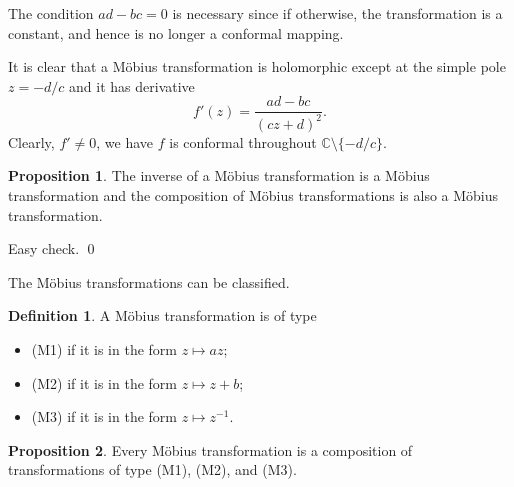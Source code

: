 \documentclass[
]{article}
\theoremstyle{definition}
\newtheorem{prop}{Proposition}
\theoremstyle{definition}
\newtheorem{definition}{Definition}[section]
\begin{document}
The condition \(ad - bc = 0\) is necessary since if otherwise, the
transformation is a constant, and hence is no longer a conformal
mapping.

It is clear that a Möbius transformation is holomorphic except at the
simple pole \(z = - d / c\) and it has derivative
\[f'(z) = \frac{ad - bc}{(cz + d)^2}.\] Clearly, \(f' \neq 0\), we have
\(f\) is conformal throughout \(\mathbb{C} \setminus \{- d / c\}\).

\begin{prop}
  The inverse of a Möbius transformation is a Möbius transformation and the composition 
  of Möbius transformations is also a Möbius transformation.
\end{prop}
\proof

Easy check. \qed

The Möbius transformations can be classified.

\begin{definition}
  A Möbius transformation is of type 
  \begin{itemize}
    \item (M1) if it is in the form \(z \mapsto az\);
    \item (M2) if it is in the form \(z \mapsto z + b\);
    \item (M3) if it is in the form \(z \mapsto z^{-1}\).
  \end{itemize}
\end{definition}

\begin{prop}
  Every Möbius transformation is a composition of transformations of type 
  (M1), (M2), and (M3).
\end{prop}
\end{document}
